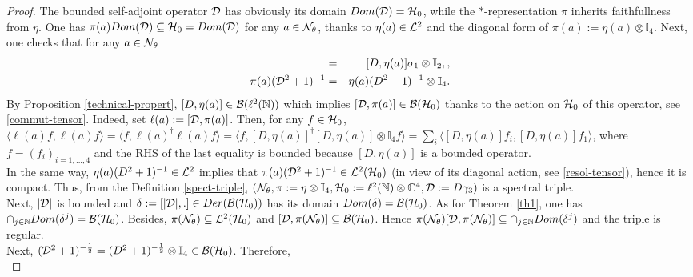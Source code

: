 \documentclass[a4paper,11pt,twoside]{article}
\numberwithin{equation}{section}
\newcommand\bbone{{ \mathbb{I}}}
\theoremstyle{nonumberplain}
\newtheorem{proof}{Proof}
\newcounter{and}
\begin{document}
\begin{proof}
The bounded self-adjoint operator ${\cal{D}}$ has obviously its domain $Dom({\cal{D}})={\cal{H}}_0$, while the $*$-representation $\pi$ inherits faithfullness from $\eta$. One has $\pi(a)Dom({\cal{D}})\subseteq {\cal{H}}_0=Dom({\cal{D}})$ for any $a\in{\cal{N}}_\theta$, thanks to $\eta(a)\in{\cal{L}}^2$ and the diagonal form of $\pi(a):=\eta(a)\otimes\bbone_4$. Next, one checks that for any $a\in{\cal{N}}_\theta$
\begin{eqnarray}
[{\cal{D}},\pi(a)]&=&[D,\eta(a)]\sigma_1\otimes\bbone_2,\label{commut-tensor},\\
\pi(a)({\cal{D}}^2+1)^{-1}&=&\eta(a)(D^2+1)^{-1}\otimes\bbone_4\label{resol-tensor}.
\end{eqnarray}
By Proposition \ref{technical-propert}, $[D,\eta(a)]\in{\cal{B}}(\ell^2(\mathbb{N}))$ which implies $[{\cal{D}},\pi(a)]\in{\cal{B}}({\cal{H}}_0)$ thanks to the action on ${\cal{H}}_0$ of this operator, see \eqref{commut-tensor}. Indeed, set $\ell(a):=[{\cal{D}},\pi(a)]$. Then, for any $f\in{\cal{H}}_0$, $\langle \ell(a)f ,\ell(a)f \rangle=\langle f ,\ell(a)^\dag\ell(a)f \rangle=\langle f ,[D,\eta(a)]^\dag[D,\eta(a)]\otimes\bbone_4f \rangle=\sum_i\langle [D,\eta(a)]f_i , [D,\eta(a)]f_1\rangle$, where $f=(f_i)_{i=1,...,4}$ and the RHS of the last equality is bounded because $[D,\eta(a)]$ is a bounded operator. \\
In the same way, $\eta(a)(D^2+1)^{-1}\in{\cal{L}}^2$ implies that $\pi(a)({\cal{D}}^2+1)^{-1}\in{\cal{L}}^2({\cal{H}}_0)$ (in view of its diagonal action, see \eqref{resol-tensor}), hence it is compact. Thus, from the Definition \ref{spect-triple}, $({\cal{N}}_\theta,\pi:=\eta\otimes\bbone_4,{\cal{H}}_0:=\ell^2(\mathbb{N})\otimes\mathbb{C}^4,{\cal{D}}:=D\gamma_3)$ is a spectral triple.\\
Next, $|{\cal{D}}|$ is bounded and $\delta:=[|{\cal{D}}|,.]\in Der({\cal{B}}({\cal{H}}_0))$ has its domain $Dom(\delta)={\cal{B}}({\cal{H}}_0)$. As for Theorem \ref{th1}, one has $\cap_{j\in\mathbb{N}}Dom(\delta^j) ={\cal{B}}({\cal{H}}_0)$. Besides, $\pi({\cal{N}}_\theta)\subseteq{\cal{L}}^2({\cal{H}}_0)$ and $[{\cal{D}},\pi({\cal{N}}_\theta)]\subseteq{\cal{B}}({\cal{H}}_0)$. Hence $\pi({\cal{N}}_\theta)[{\cal{D}},\pi({\cal{N}}_\theta)]\subseteq\cap_{j\in\mathbb{N}}Dom(\delta^j)$ and the triple is regular.\\
Next, $({\cal{D}}^2+1)^{-\frac{1}{2}}=(D^2+1)^{-\frac{1}{2}}\otimes\bbone_4\in{\cal{B}}({\cal{H}}_0)$. Therefore,
\begin{equation}

\end{equation}
\end{proof}
\end{document}
